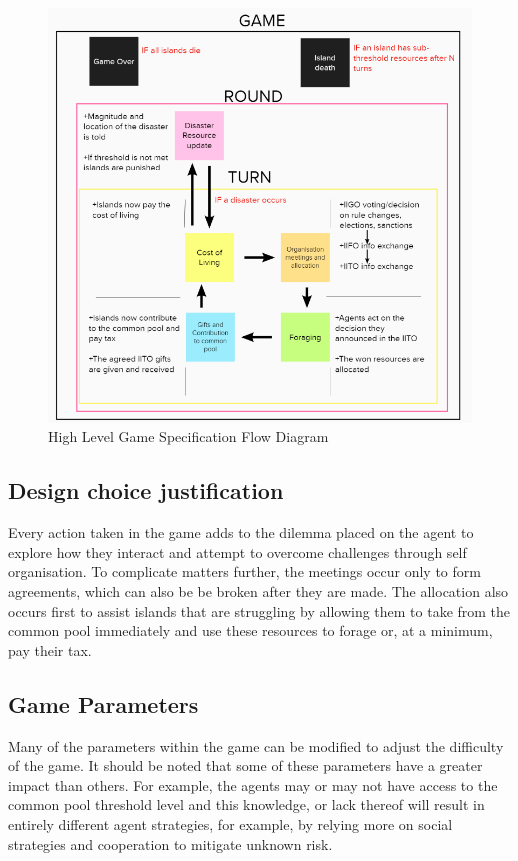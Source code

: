 \begin{figure}[!htb]
    \centering
    \includegraphics{images/gamespec-flow.png}
    \caption{High Level Game Specification Flow Diagram}
    \label{fig:gamedesign-flow}
\end{figure}

\subsection{Design choice justification}
Every action taken in the game adds to the dilemma placed on the agent to explore how they interact and attempt to overcome challenges through self organisation. To complicate matters further, the meetings occur only to form agreements, which can also be be broken after they are made. The allocation also occurs first to assist islands that are struggling by allowing them to take from the common pool immediately and use these resources to forage or, at a minimum, pay their tax.

\subsection{Game Parameters}
Many of the parameters within the game can be modified to adjust the difficulty of the game. It should be noted that some of these parameters have a greater impact than others. For example, the agents may or may not have access to the common pool threshold level and this knowledge, or lack thereof will result in entirely different agent strategies, for example, by relying more on social strategies and cooperation to mitigate unknown risk.

